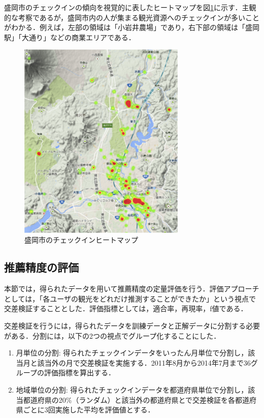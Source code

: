 \documentclass{jsarticle}
\begin{document}
盛岡市のチェックインの傾向を視覚的に表したヒートマップを図\ref{heatmap2}に示す．主観的な考察であるが，盛岡市内の人が集まる観光資源へのチェックインが多いことがわかる．例えば，左部の領域は「小岩井農場」であり，右下部の領域は「盛岡駅」「大通り」などの商業エリアである．

\begin{figure}[!ht]
\begin{center}
\includegraphics[width=8.0cm]{./image/heatmap2.png}
\caption{盛岡市のチェックインヒートマップ}
\label{heatmap2}
\end{center}
\end{figure}


\subsection{推薦精度の評価}

本節では，得られたデータを用いて推薦精度の定量評価を行う．評価アプローチとしては，「各ユーザの観光をどれだけ推測することができたか」という視点で交差検証することとした．評価指標としては，適合率，再現率，f値である．

交差検証を行うには，得られたデータを訓練データと正解データに分割する必要がある．分割には，以下の2つの視点でグループ化することにした．

\begin{enumerate}
\item 月単位の分割: 得られたチェックインデータをいったん月単位で分割し，該当月と該当外の月で交差検証を実施する．2011年8月から2014年7月まで36グループの評価指標を算出する．
\item 地域単位の分割: 得られたチェックインデータを都道府県単位で分割し，該当都道府県の20\%（ランダム）と該当外の都道府県とで交差検証を各都道府県ごとに3回実施した平均を評価値とする．
\end{enumerate}
\end{document}
